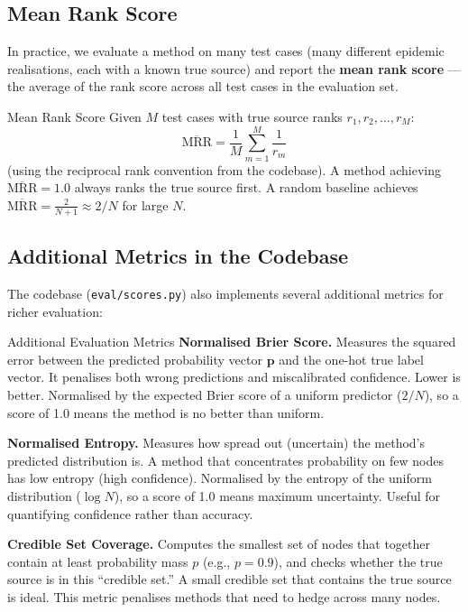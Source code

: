 \subsection{Mean Rank Score}

In practice, we evaluate a method on many test cases (many different epidemic
realisations, each with a known true source) and report the
\textbf{mean rank score} — the average of the rank score across all test
cases in the evaluation set.

\begin{mathbox}{Mean Rank Score}
Given $M$ test cases with true source ranks $r_1, r_2, \ldots, r_M$:
\begin{equation}
    \overline{\text{MRR}}
    = \frac{1}{M} \sum_{m=1}^{M} \frac{1}{r_m}
    \label{eq:mean-rr}
\end{equation}
(using the reciprocal rank convention from the codebase). A method achieving
$\overline{\text{MRR}} = 1.0$ always ranks the true source first.
A random baseline achieves $\overline{\text{MRR}} = \frac{2}{N+1} \approx
2/N$ for large $N$.
\end{mathbox}

\subsection{Additional Metrics in the Codebase}

The codebase (\texttt{eval/scores.py}) also implements several additional
metrics for richer evaluation:

\begin{conceptbox}{Additional Evaluation Metrics}
\textbf{Normalised Brier Score.} Measures the squared error between the
predicted probability vector $\mathbf{p}$ and the one-hot true label vector.
It penalises both wrong predictions and miscalibrated confidence. Lower is
better. Normalised by the expected Brier score of a uniform predictor
($2/N$), so a score of 1.0 means the method is no better than uniform.

\textbf{Normalised Entropy.} Measures how spread out (uncertain) the
method's predicted distribution is. A method that concentrates probability
on few nodes has low entropy (high confidence). Normalised by the entropy of
the uniform distribution ($\log N$), so a score of 1.0 means maximum
uncertainty. Useful for quantifying confidence rather than accuracy.

\textbf{Credible Set Coverage.} Computes the smallest set of nodes that
together contain at least probability mass $p$ (e.g., $p = 0.9$), and checks
whether the true source is in this ``credible set.'' A small credible set
that contains the true source is ideal. This metric penalises methods that
need to hedge across many nodes.
\end{conceptbox}

